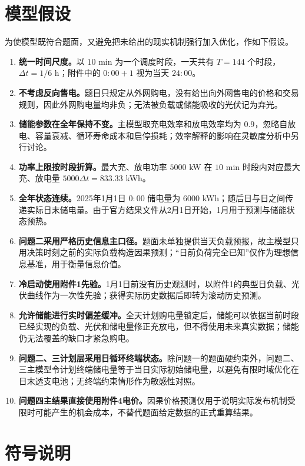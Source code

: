 \section{模型假设}

为使模型既符合题面，又避免把未给出的现实机制强行加入优化，作如下假设。
\begin{enumerate}[label=\arabic*., itemsep=2pt, topsep=3pt]
    \item \textbf{统一时间尺度。}以 $10$ min 为一个调度时段，一天共有 $T=144$ 个时段，$\Delta t=1/6$ h；附件中的 $0{:}00{+}1$ 视为当天 $24{:}00$。
    \item \textbf{不考虑反向售电。}题目只规定从外网购电，没有给出向外网售电的价格和交易规则，因此外网购电量均非负；无法被负载或储能吸收的光伏记为弃光。
    \item \textbf{储能参数在全年保持不变。}主模型取充电效率和放电效率均为 $0.9$，忽略自放电、容量衰减、循环寿命成本和启停损耗；效率解释的影响在灵敏度分析中另行讨论。
    \item \textbf{功率上限按时段折算。}最大充、放电功率 $5000$ kW 在 $10$ min 时段内对应最大充、放电量 $5000\Delta t=833.33$ kWh。
    \item \textbf{全年状态连续。}2025年1月1日 $0{:}00$ 储电量为 $6000$ kWh；随后日与日之间传递实际日末储电量。由于官方结果文件从2月1日开始，1月用于预测与储能状态预热。
    \item \textbf{问题二采用严格历史信息主口径。}题面未单独提供当天负载预报，故主模型只用决策时刻之前的实际负载构造因果预测；“日前负荷完全已知”仅作为理想信息基准，用于衡量信息价值。
    \item \textbf{冷启动使用附件1先验。}1月1日前没有历史观测时，以附件1的典型日负载、光伏曲线作为一次性先验；获得实际历史数据后即转为滚动历史预测。
    \item \textbf{允许储能进行实时偏差缓冲。}全天计划购电量锁定后，储能可以依据当前时段已经实现的负载、光伏和储电量修正充放电，但不得使用未来真实数据；储能仍无法覆盖的缺口才紧急购电。
    \item \textbf{问题二、三计划层采用日循环终端状态。}除问题一的题面硬约束外，问题二、三主模型令计划终端储电量等于当日实际初始储电量，以避免有限时域优化在日末透支电池；无终端约束情形作为敏感性对照。
    \item \textbf{问题四主结果直接使用附件4电价。}因果价格预测仅用于说明实际发布机制受限时可能产生的机会成本，不替代题面给定数据的正式重算结果。
\end{enumerate}

\section{符号说明}

